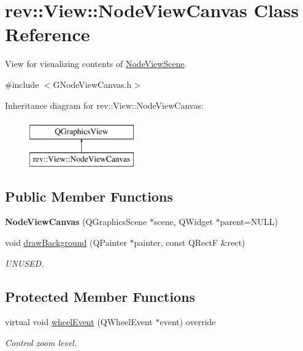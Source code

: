 \hypertarget{classrev_1_1_view_1_1_node_view_canvas}{}\section{rev\+::View\+::Node\+View\+Canvas Class Reference}
\label{classrev_1_1_view_1_1_node_view_canvas}


View for visualizing contents of \mbox{\hyperlink{classrev_1_1_view_1_1_node_view_scene}{Node\+View\+Scene}}.  




{\ttfamily \#include $<$G\+Node\+View\+Canvas.\+h$>$}

Inheritance diagram for rev\+::View\+::Node\+View\+Canvas\+:\begin{figure}[H]
\begin{center}
\leavevmode
\includegraphics[height=2.000000cm]{classrev_1_1_view_1_1_node_view_canvas}
\end{center}
\end{figure}
\subsection*{Public Member Functions}
\begin{DoxyCompactItemize}
\item 
\mbox{\label{classrev_1_1_view_1_1_node_view_canvas_a1ca61c7f38757d1bc36547eeccaedf94}} 
{\bfseries Node\+View\+Canvas} (Q\+Graphics\+Scene $\ast$scene, Q\+Widget $\ast$parent=N\+U\+LL)
\item 
void \mbox{\hyperlink{classrev_1_1_view_1_1_node_view_canvas_afe051736b0d1ec212513026dae241b9c}{draw\+Background}} (Q\+Painter $\ast$painter, const Q\+RectF \&rect)
\begin{DoxyCompactList}\small\item\em U\+N\+U\+S\+ED. \end{DoxyCompactList}\end{DoxyCompactItemize}
\subsection*{Protected Member Functions}
\begin{DoxyCompactItemize}
\item 
\mbox{\label{classrev_1_1_view_1_1_node_view_canvas_aa74ecb8820f10b6958c1437b1933d308}} 
virtual void \mbox{\hyperlink{classrev_1_1_view_1_1_node_view_canvas_aa74ecb8820f10b6958c1437b1933d308}{wheel\+Event}} (Q\+Wheel\+Event $\ast$event) override
\begin{DoxyCompactList}\small\item\em Control zoom level. \end{DoxyCompactList}\end{DoxyCompactItemize}


